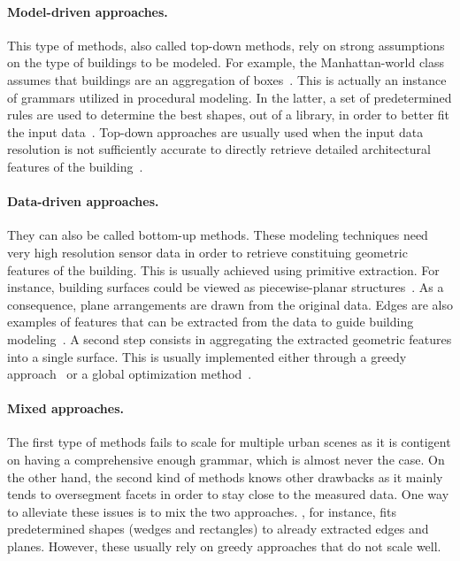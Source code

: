         \paragraph{Model-driven approaches.}
            This type of methods, also called top-down methods, rely on strong assumptions on the type of buildings to be modeled.
            For example, the Manhattan-world class assumes that buildings are an aggregation of boxes~\parencite{vanegas2010building,ledoux2011topologically,arroyo2015dimension,li2016manhattan}.
            This is actually an instance of grammars utilized in procedural modeling.
            In the latter, a set of predetermined rules are used to determine the best shapes, out of a library, in order to better fit the input data~\parencite{lafarge2008structural,koutsourakis2009single,zhou20102,simon2011random,mathias2011procedural,martinovic2013bayesian,nan2015template,demir2015procedural,zeng2018neural}.
            Top-down approaches are usually used when the input data resolution is not sufficiently accurate to directly retrieve detailed architectural features of the building~\parencite{lafarge2008structural}.

        \paragraph{Data-driven approaches.}
            They can also be called bottom-up methods.
            These modeling techniques need very high resolution sensor data in order to retrieve constituing geometric features of the building.
            This is usually achieved using primitive extraction.
            For instance, building surfaces could be viewed as piecewise-planar structures~\parencite{taillandier2004automatic,chauve2010robust,lafarge2012creating,nan2017polyfit}.
            As a consequence, plane arrangements are drawn from the original data.
            Edges are also examples of features that can be extracted from the data to guide building modeling~\parencite{baillard1999automatic}.
            A second step consists in aggregating the extracted geometric features into a single surface.
            This is usually implemented either through a greedy approach~\parencite{taillandier2004automatic} or a global optimization method~\parencite{poullis2013framework,verdie2015lod,zhu2018large,holzmann2018semantically}.

        \paragraph{Mixed approaches.}
            The first type of methods fails to scale for multiple urban scenes as it is contigent on having a comprehensive enough grammar, which is almost never the case.
            On the other hand, the second kind of methods knows other drawbacks as it mainly tends to oversegment facets in order to stay close to the measured data.
            One way to alleviate these issues is to mix the two approaches.
            \textcite{werner2002new}, for instance, fits predetermined shapes (wedges and rectangles) to already extracted edges and planes.
            However, these usually rely on greedy approaches that do not scale well.\\

